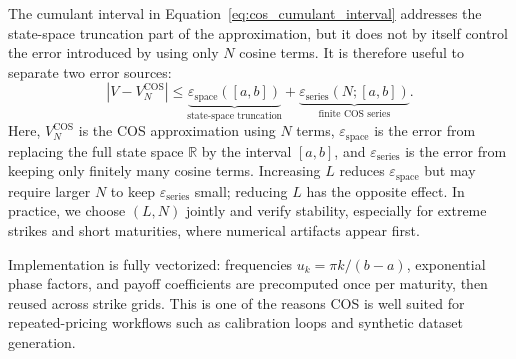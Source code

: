 The cumulant interval in Equation~\eqref{eq:cos_cumulant_interval} addresses the state-space truncation part of the approximation, but it does not by itself control the error introduced by using only $N$ cosine terms. It is therefore useful to separate two error sources:
\begin{equation}
    \label{eq:cos_error_split}
    \left|V-V_N^{\mathrm{COS}}\right|
    \le
    \underbrace{\varepsilon_{\mathrm{space}}([a,b])}_{\text{state-space truncation}}
    +
    \underbrace{\varepsilon_{\mathrm{series}}(N;[a,b])}_{\text{finite COS series}}.
\end{equation}
Here, $V_N^{\mathrm{COS}}$ is the COS approximation using $N$ terms, $\varepsilon_{\mathrm{space}}$ is the error from replacing the full state space $\mathbb R$ by the interval $[a,b]$, and $\varepsilon_{\mathrm{series}}$ is the error from keeping only finitely many cosine terms. Increasing $L$ reduces $\varepsilon_{\mathrm{space}}$ but may require larger $N$ to keep $\varepsilon_{\mathrm{series}}$ small; reducing $L$ has the opposite effect. In practice, we choose $(L,N)$ jointly and verify stability, especially for extreme strikes and short maturities, where numerical artifacts appear first.

Implementation is fully vectorized: frequencies $u_k=\pi k/(b-a)$, exponential phase factors, and payoff coefficients are precomputed once per maturity, then reused across strike grids. This is one of the reasons COS is well suited for repeated-pricing workflows such as calibration loops and synthetic dataset generation.


